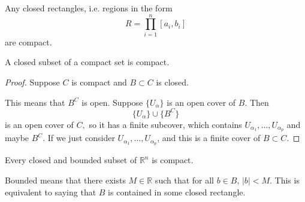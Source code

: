 \begin{itemize}
          \begin{corollary}
              Any closed rectangles, i.e. regions in the form
              \begin{equation}
                  R = \prod_{i=1}^n [a_i,b_i]
              \end{equation}
              are compact.
          \end{corollary}
          \begin{proposition}
              A closed subset of a compact set is compact.
          \end{proposition}
          \begin{proof}
              Suppose $C$ is compact and $B \subset C$ is closed.

              This means that $B^C$ is open. Suppose $\{U_\alpha\}$ is an open cover of $B$. Then
              \begin{equation}
                  \{U_\alpha\} \cup \{B^C\}
              \end{equation}
              is an open cover of $C,$ so it has a finite subcover, which contains $U_{\alpha_1},\dots,U_{\alpha_p}$ and maybe $B^C$. If we just consider $U_{\alpha_1},\dots,U_{\alpha_p}$, and this is a finite cover of $B\subset C$.
          \end{proof}
          \begin{corollary}
              Every closed and bounded subset of $\mathbb{R}^n$ is compact.
          \end{corollary}
          \begin{definition}
              Bounded means that there exists $M\in \mathbb{R}$ such that for all $b\in B$, $|b|<M$. This is equivalent to saying that $B$ is contained in some closed rectangle.
          \end{definition}

\end{itemize}
